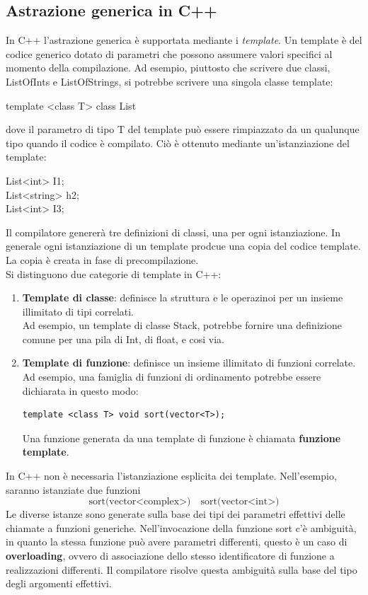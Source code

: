 \documentclass[12pt]{report}
\begin{document}
\subsection{Astrazione generica in C++}
In C++ l'astrazione generica è supportata mediante i \textit{template}. Un template è del codice generico dotato di parametri che possono assumere valori specifici al momento della compilazione. Ad esempio, piuttosto che scrivere due classi, ListOfInts e ListOfStrings, si potrebbe scrivere una singola classe template:
\begin{center}
	template <class T> class List
\end{center}
dove il parametro di tipo T del template può essere rimpiazzato da un qualunque tipo quando il codice è compilato. Ciò è ottenuto mediante un'istanziazione del template:
\begin{center}
	List<int> I1; \\
	List<string> h2; \\
	List<int> I3;
\end{center}
Il compilatore genererà tre definizioni di classi, una per ogni istanziazione. In generale ogni istanziazione di un template prodcue una copia del codice template. La copia è creata in fase di precompilazione. \\
Si distinguono due categorie di template in C++:
\begin{enumerate}
	\item \textbf{Template di classe}: definisce la struttura e le operazinoi per un insieme illimitato di tipi correlati. \\
	Ad esempio, un template di classe Stack, potrebbe fornire una definizione comune per una pila di Int, di float, e cosi via.
	\item \textbf{Template di funzione}: definisce un insieme illimitato di funzioni correlate. \\
	Ad esempio, una famiglia di funzioni di ordinamento potrebbe essere dichiarata in questo modo:
	\begin{lstlisting}[style=cppstyle]
template <class T> void sort(vector<T>);\end{lstlisting}
Una funzione generata da una template di funzione è chiamata \textbf{funzione template}.
\end{enumerate}
In C++ non è necessaria l'istanziazione esplicita dei template. Nell'esempio, saranno istanziate due funzioni
\[
\text{sort(vector<complex>)} \quad \text{sort(vector<int>)}
\]
Le diverse istanze sono generate sulla base dei tipi dei parametri effettivi delle chiamate a funzioni generiche. Nell'invocazione della funzione sort c'è ambiguità, in quanto la stessa funzione può avere parametri differenti, questo è un caso di \textbf{overloading}, ovvero di associazione dello stesso identificatore di funzione a realizzazioni differenti. Il compilatore risolve questa ambiguità sulla base del tipo degli argomenti effettivi.
\end{document}
